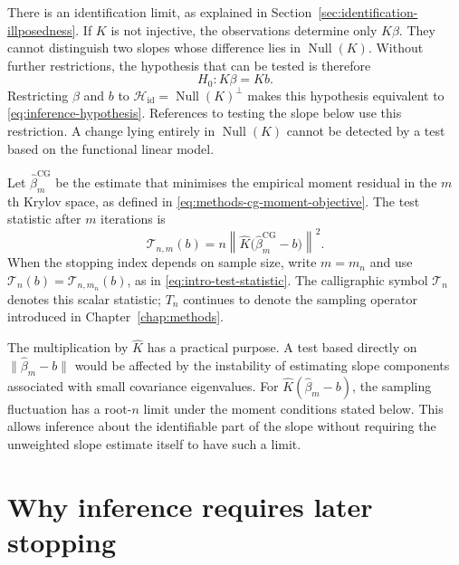 There is an identification limit, as explained in
Section~\ref{sec:identification-illposedness}.  If $K$ is not injective, the
observations determine only $K\beta$.  They cannot distinguish two slopes
whose difference lies in $\operatorname{Null}(K)$.  Without further
restrictions, the hypothesis that can be tested is therefore
\begin{equation}
    H_0:K\beta=Kb.
    \label{eq:inference-moment-null}
\end{equation}
Restricting $\beta$ and $b$ to
$\mathcal H_{\mathrm{id}}=\operatorname{Null}(K)^\perp$ makes this hypothesis
equivalent to \eqref{eq:inference-hypothesis}.  References to testing the
slope below use this restriction.  A change lying entirely in
$\operatorname{Null}(K)$ cannot be detected by a test based on the functional
linear model.

Let $\widehat\beta_m^{\mathrm{CG}}$ be the estimate that minimises the
empirical moment residual in the $m$th Krylov space, as defined in
\eqref{eq:methods-cg-moment-objective}.  The test statistic after $m$
iterations is
\begin{equation}
    \mathcal T_{n,m}(b)
    =n\left\|
       \widehat K\bigl(\widehat\beta_m^{\mathrm{CG}}-b\bigr)
      \right\|^2.
    \label{eq:inference-finite-m-statistic}
\end{equation}
When the stopping index depends on sample size, write $m=m_n$ and use
$\mathcal T_n(b)=\mathcal T_{n,m_n}(b)$, as in
\eqref{eq:intro-test-statistic}.  The calligraphic symbol $\mathcal T_n$
denotes this scalar statistic; $T_n$ continues to denote the sampling
operator introduced in Chapter~\ref{chap:methods}.

The multiplication by $\widehat K$ has a practical purpose.  A test based
directly on $\|\widehat\beta_m-b\|$ would be affected by the instability of
estimating slope components associated with small covariance eigenvalues.
For $\widehat K(\widehat\beta_m-b)$, the sampling fluctuation has a root-$n$
limit under the moment conditions stated below.  This allows inference about
the identifiable part of the slope without requiring the unweighted slope
estimate itself to have such a limit.

\section{Why inference requires later stopping}
\label{sec:inference-late-stopping}

